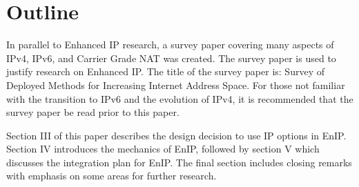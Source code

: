 \documentclass[letterpaper,final,peerreview,10pt,onecolumn]{IEEEtranTCOM}
\begin{document}
\section{Outline}
In parallel to Enhanced IP research, a survey paper covering many aspects
of IPv4, IPv6, and Carrier Grade NAT was created.  The survey paper is used
to justify research on Enhanced IP.  The title of the survey paper is:
Survey of Deployed Methods for Increasing Internet Address Space.  For those not familiar with the transition
to IPv6 and the evolution of IPv4, it is recommended that the survey paper
be read prior to this paper.

Section III of this paper describes the design decision to use IP options in EnIP.
Section IV introduces the mechanics of EnIP, followed by section V which
discusses the integration plan for EnIP.  
The final section includes closing remarks with emphasis on some areas
for further research.

%  


    
	



\end{document}
